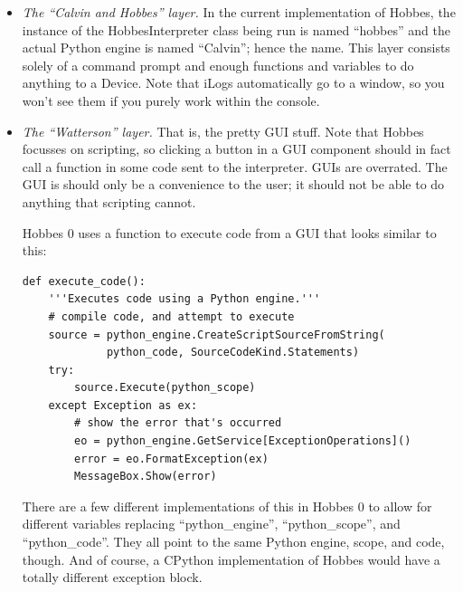 \documentclass[12pt,letterpaper]{article}
\begin{document}
\begin{itemize}

\item \emph{The ``Calvin and Hobbes'' layer.} In the current implementation of Hobbes, the instance of the HobbesInterpreter class being run is named ``hobbes'' and the actual Python engine is named ``Calvin''; hence the name. This layer consists solely of a command prompt and enough functions and variables to do anything to a Device. Note that iLogs automatically go to a window, so you won't see them if you purely work within the console.

\item \emph{The ``Watterson'' layer.} That is, the pretty GUI stuff. Note that Hobbes focusses on scripting, so clicking a button in a GUI component should in fact call a function in some code sent to the interpreter. GUIs are overrated. The GUI is should only be a convenience to the user; it should not be able to do anything that scripting cannot.

Hobbes 0 uses a function to execute code from a GUI that looks similar to this:

\selectfont

\begin{lstlisting}
def execute_code():
    '''Executes code using a Python engine.'''
    # compile code, and attempt to execute
    source = python_engine.CreateScriptSourceFromString(
             python_code, SourceCodeKind.Statements)
    try:
        source.Execute(python_scope)
    except Exception as ex:
        # show the error that's occurred
        eo = python_engine.GetService[ExceptionOperations]()
        error = eo.FormatException(ex)
        MessageBox.Show(error)
\end{lstlisting}

\selectfont

There are a few different implementations of this in Hobbes 0 to allow for different variables replacing ``python\_engine'', ``python\_scope'', and ``python\_code''. They all point to the same Python engine, scope, and code, though. And of course, a CPython implementation of Hobbes would have a totally different exception block.

\end{itemize}

\end{document}
